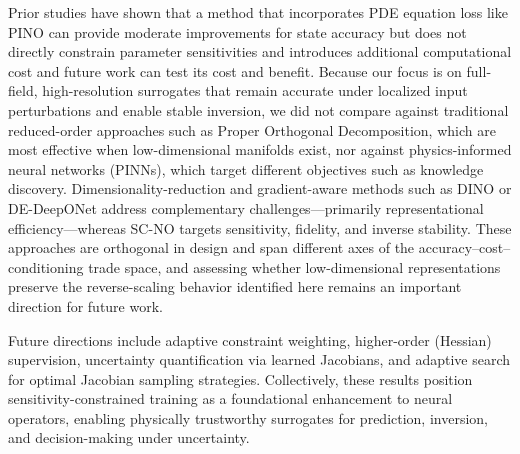 Prior studies have shown that a method that incorporates PDE equation loss like PINO can provide moderate improvements for state accuracy but does not directly constrain parameter sensitivities and introduces additional computational cost \citep{behroozi2025sensitivity} and future work can test its cost and benefit. Because our focus is on full-field, high-resolution surrogates that remain accurate under localized input perturbations and enable stable inversion, we did not compare against traditional reduced-order approaches such as Proper Orthogonal Decomposition, which are most effective when low-dimensional manifolds exist, nor against physics-informed neural networks (PINNs), which target different objectives such as knowledge discovery. Dimensionality-reduction and gradient-aware methods such as DINO or DE-DeepONet address complementary challenges—primarily representational efficiency—whereas SC-NO targets sensitivity, fidelity, and inverse stability. These approaches are orthogonal in design and span different axes of the accuracy–cost–conditioning trade space, and assessing whether low-dimensional representations preserve the reverse-scaling behavior identified here remains an important direction for future work.

Future directions include adaptive constraint weighting, higher-order (Hessian) supervision, uncertainty quantification via learned Jacobians, and adaptive search for optimal Jacobian sampling strategies. Collectively, these results position sensitivity-constrained training as a foundational enhancement to neural operators, enabling physically trustworthy surrogates for prediction, inversion, and decision-making under uncertainty.
